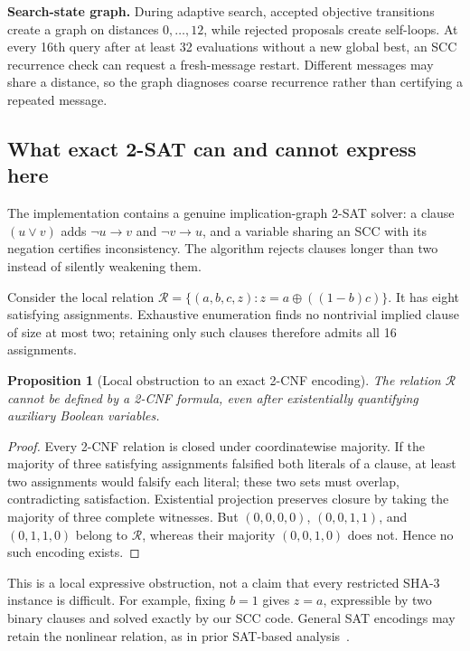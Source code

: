 \documentclass[11pt]{article}
\newtheorem{proposition}{Proposition}
\begin{document}
\textbf{Search-state graph.} During adaptive search, accepted objective transitions create a graph on distances $0,\ldots,12$, while rejected proposals create self-loops. At every 16th query after at least 32 evaluations without a new global best, an SCC recurrence check can request a fresh-message restart. Different messages may share a distance, so the graph diagnoses coarse recurrence rather than certifying a repeated message.

\subsection{What exact 2-SAT can and cannot express here}

The implementation contains a genuine implication-graph 2-SAT solver: a clause $(u\lor v)$ adds $\neg u\to v$ and $\neg v\to u$, and a variable sharing an SCC with its negation certifies inconsistency. The algorithm rejects clauses longer than two instead of silently weakening them.

Consider the local relation $\mathcal R=\{(a,b,c,z):z=a\oplus((1-b)c)\}$. It has eight satisfying assignments. Exhaustive enumeration finds no nontrivial implied clause of size at most two; retaining only such clauses therefore admits all 16 assignments.

\begin{proposition}[Local obstruction to an exact 2-CNF encoding]
The relation $\mathcal R$ cannot be defined by a 2-CNF formula, even after existentially quantifying auxiliary Boolean variables.
\end{proposition}
\begin{proof}
Every 2-CNF relation is closed under coordinatewise majority. If the majority of three satisfying assignments falsified both literals of a clause, at least two assignments would falsify each literal; these two sets must overlap, contradicting satisfaction. Existential projection preserves closure by taking the majority of three complete witnesses. But $(0,0,0,0)$, $(0,0,1,1)$, and $(0,1,1,0)$ belong to $\mathcal R$, whereas their majority $(0,0,1,0)$ does not. Hence no such encoding exists.
\end{proof}

This is a local expressive obstruction, not a claim that every restricted SHA-3 instance is difficult. For example, fixing $b=1$ gives $z=a$, expressible by two binary clauses and solved exactly by our SCC code. General SAT encodings may retain the nonlinear relation, as in prior SAT-based analysis~\cite{satkeccak}.
\end{document}
